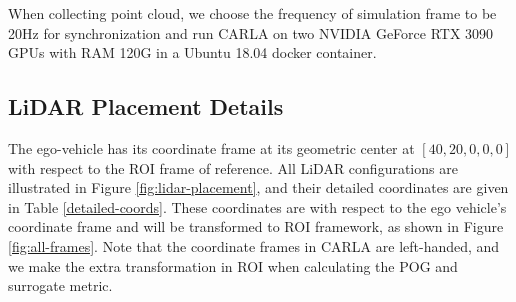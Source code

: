 \documentclass[10pt,twocolumn,letterpaper]{article}
\begin{document}
When collecting point cloud, we choose the frequency of simulation frame to be 20Hz for synchronization and run CARLA on two NVIDIA GeForce RTX 3090 GPUs with RAM 120G in a Ubuntu 18.04 docker container.







\subsection{LiDAR Placement Details}
The ego-vehicle has its coordinate frame at its geometric center at $[40,20,0,0,0]$ with respect to the ROI frame of reference. All LiDAR configurations are illustrated in Figure \ref{fig:lidar-placement}, and their detailed coordinates are given in Table {\ref{detailed-coords}}. These coordinates are with respect to the ego vehicle's coordinate frame and will be transformed to ROI framework, as shown in Figure {\ref{fig:all-frames}}.  Note that the coordinate frames in CARLA are left-handed, and we make the extra transformation in ROI when calculating the POG and surrogate metric.
\end{document}
